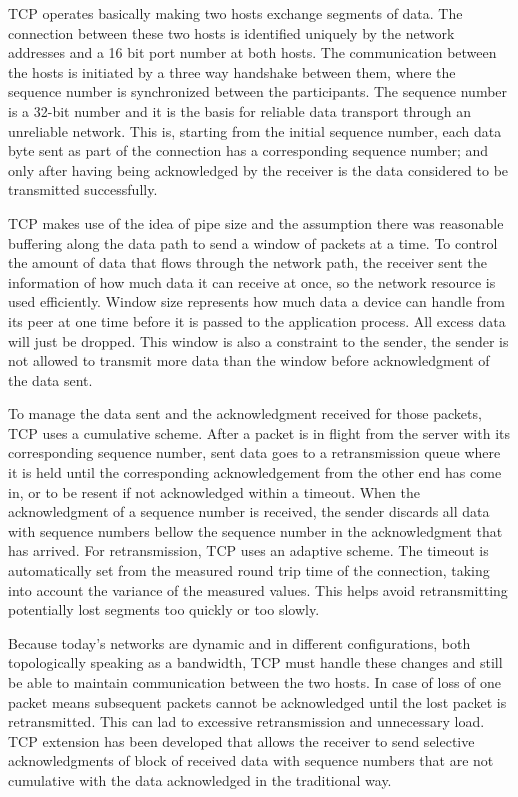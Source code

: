 TCP operates basically making two hosts exchange segments of data. The
connection between these two hosts is identified uniquely by the network addresses and a 16 bit port number at both hosts. The communication between the
hosts is initiated by a three way handshake between them, where the
sequence number is synchronized between the participants. The sequence number
is a 32-bit number and it is the basis for reliable data transport through an unreliable network. This is, starting from the initial sequence
number, each data byte sent as part of the connection has a corresponding
sequence number; and only after having being acknowledged by the receiver is
the data considered to be transmitted successfully.

TCP makes use of the idea of pipe size and the assumption there was reasonable buffering along the data path to send a window of packets at
a time. To control the amount of data that flows through the network path, the
receiver sent the information of how much data it can receive at once, so the
network resource is used efficiently. Window size represents how much data a
device can handle from its peer at one time before it is passed to the
application process. All excess data will just be dropped. This window
is also a constraint to the sender, the sender is not allowed to
transmit more data than the window before acknowledgment of the data sent.

To manage the data sent and the acknowledgment received for those packets, TCP
uses a cumulative scheme. After a packet is in flight from the server with its
corresponding sequence number, sent data goes to a retransmission queue where
it is held until the corresponding acknowledgement from the other end has come in,
or to be resent if not acknowledged within a timeout. When the
acknowledgment of a sequence number is received, the sender discards all data
with sequence numbers bellow the sequence number in the acknowledgment that
has arrived. For retransmission, TCP uses an adaptive scheme. The timeout is
automatically set from the measured round trip time of the connection,
taking into account the variance of the measured values\cite{JacobsonCAC}.
This helps avoid retransmitting potentially lost segments too quickly or too
slowly.

Because today's networks are dynamic and in different configurations, both
topologically speaking as a  bandwidth, TCP must handle these changes and
still be able to maintain communication between the two hosts. In case of
loss of one packet means subsequent packets cannot be acknowledged until the
lost packet is retransmitted. This can lad to excessive retransmission and
unnecessary load. TCP extension has been developed that allows the receiver to
send selective acknowledgments of block of received data with sequence numbers
that are not cumulative with the data acknowledged in the traditional
way\cite{RFC2018}.

